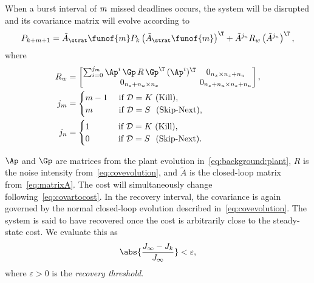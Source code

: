 When a burst interval of $m$ missed deadlines occurs, the system will be disrupted and its covariance matrix will evolve according to
%
\begin{equation}
\label{eq:covariance-evolution}
    P_{k+\nummisses+1} = \tilde A_{\strat}\funof{m} P_k \left( \tilde A_{\strat}\funof{m} \right)^\T + \tilde A^{j_{\numhits}} R_w \left( \tilde A^{j_{\numhits}} \right)^\T,
\end{equation}
where
\begin{equation}
\label{eq:evolutionparameters}
\setlength\arraycolsep{2pt}
    \begin{aligned}
        R_w &= 
        \begin{bmatrix} 
            \sum_{i=0}^{j_{\nummisses}} \Ap^i\,\Gp\,R\,\Gp^\T\,(\Ap^i)^\T & 0_{n_x \times n_z+n_u} \\ 
            0_{n_z + n_u \times n_x}               & 0_{n_z + n_u \times n_z+ n_u}
        \end{bmatrix}, \\
        j_{\nummisses} &= 
        \begin{cases} 
            \nummisses - 1 & \text{ if } \dstrat = K\,\, \text{(Kill),} \\ 
            \nummisses & \text{ if } \dstrat = S\,\,\,\, \text{(Skip-Next),} 
        \end{cases} \\
        j_{\numhits} &= 
        \begin{cases} 
            1 \phantom{||222} & \text{ if } \dstrat = K\,\, \text{(Kill),} \\ 
            0 & \text{ if } \dstrat = S\,\,\,\, \text{(Skip-Next).}
        \end{cases}
        \end{aligned}
\end{equation}

$\Ap$ and $\Gp$ are matrices from the plant evolution in~\eqref{eq:background:plant}, $R$ is the noise intensity from~\eqref{eq:covevolution}, and $\tilde A$ is the closed-loop matrix from~\eqref{eq:matrixA}.
The cost will simultaneously change following~\eqref{eq:covartocost}.
In the recovery interval, the covariance is again governed by the normal closed-loop evolution described in~\eqref{eq:covevolution}.
The system is said to have recovered once the cost is arbitrarily close to the steady-state cost.
We evaluate this as
%
\begin{equation}
    \label{eq:cost-threshold}
    \abs{\frac{J_{\infty}-J_k}{J_\infty}} < \varepsilon,
\end{equation}
where $\varepsilon> 0$ is the \emph{recovery threshold}.

